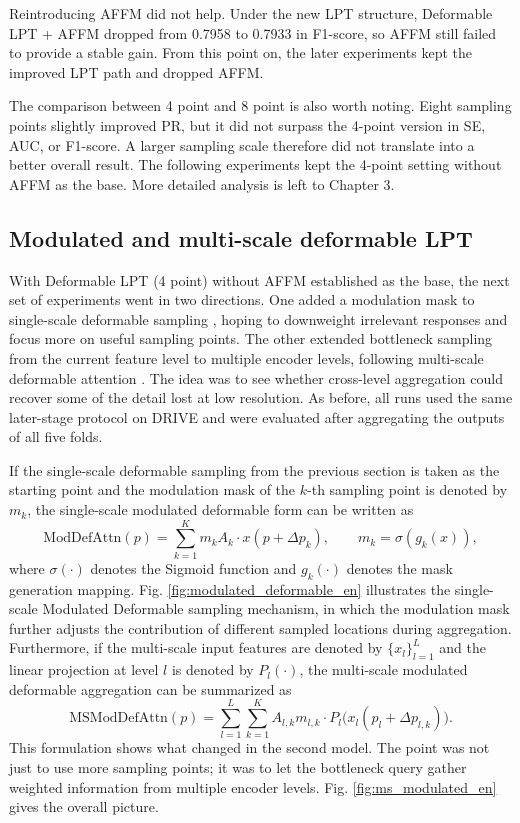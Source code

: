 \documentclass[a4paper,12pt]{article}
\begin{document}
Reintroducing AFFM did not help. Under the new LPT structure, Deformable LPT + AFFM dropped from 0.7958 to 0.7933 in F1-score, so AFFM still failed to provide a stable gain. From this point on, the later experiments kept the improved LPT path and dropped AFFM.

The comparison between 4 point and 8 point is also worth noting. Eight sampling points slightly improved PR, but it did not surpass the 4-point version in SE, AUC, or F1-score. A larger sampling scale therefore did not translate into a better overall result. The following experiments kept the 4-point setting without AFFM as the base. More detailed analysis is left to Chapter 3.

\subsection{Modulated and multi-scale deformable LPT}

With Deformable LPT (4 point) without AFFM established as the base, the next set of experiments went in two directions. One added a modulation mask to single-scale deformable sampling \cite{zhu2019dcnv2}, hoping to downweight irrelevant responses and focus more on useful sampling points. The other extended bottleneck sampling from the current feature level to multiple encoder levels, following multi-scale deformable attention \cite{zhu2021deformabledetr}. The idea was to see whether cross-level aggregation could recover some of the detail lost at low resolution. As before, all runs used the same later-stage protocol on DRIVE and were evaluated after aggregating the outputs of all five folds.

If the single-scale deformable sampling from the previous section is taken as the starting point and the modulation mask of the \(k\)-th sampling point is denoted by \(m_k\), the single-scale modulated deformable form can be written as
\[
\mathrm{ModDefAttn}(p) = \sum_{k=1}^{K} m_k A_k \cdot x(p + \Delta p_k),\qquad
m_k = \sigma(g_k(x)),
\]
where \(\sigma(\cdot)\) denotes the Sigmoid function and \(g_k(\cdot)\) denotes the mask generation mapping. Fig. \ref{fig:modulated_deformable_en} illustrates the single-scale Modulated Deformable sampling mechanism, in which the modulation mask further adjusts the contribution of different sampled locations during aggregation. Furthermore, if the multi-scale input features are denoted by \(\{x_l\}_{l=1}^{L}\) and the linear projection at level \(l\) is denoted by \(P_l(\cdot)\), the multi-scale modulated deformable aggregation can be summarized as
\[
\mathrm{MSModDefAttn}(p) = \sum_{l=1}^{L}\sum_{k=1}^{K} A_{l,k} m_{l,k} \cdot P_l\big(x_l(p_l + \Delta p_{l,k})\big).
\]
This formulation shows what changed in the second model. The point was not just to use more sampling points; it was to let the bottleneck query gather weighted information from multiple encoder levels. Fig. \ref{fig:ms_modulated_en} gives the overall picture.
\end{document}
